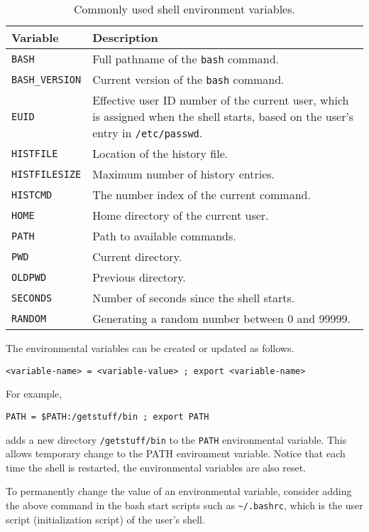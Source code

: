 \begin{table}
	\centering \caption{Commonly used shell environment variables.}\label{ch:sb:tab:shellenvironmentvars}
	\begin{tabularx}{\textwidth}{lX}
		\hline
		Variable & Description \\ \hline
		\verb|BASH| & Full pathname of the \verb|bash| command. \\ 
		\verb|BASH_VERSION| & Current version of the \verb|bash| command. \\ 
		\verb|EUID| & Effective user ID number of the current user, which is assigned when the shell starts, based on the user's entry in \verb|/etc/passwd|. \\ 
		\verb|HISTFILE| & Location of the history file. \\ 
		\verb|HISTFILESIZE| & Maximum number of history entries. \\ 
		\verb|HISTCMD| & The number index of the current command. \\ 
		\verb|HOME| & Home directory of the current user. \\ 
		\verb|PATH| & Path to available commands. \\ 
		\verb|PWD| & Current directory. \\ 
		\verb|OLDPWD| & Previous directory. \\ 
		\verb|SECONDS| & Number of seconds since the shell starts. \\ 
		\verb|RANDOM| & Generating a random number between 0 and 99999. \\
		\hline
	\end{tabularx}
\end{table}

The environmental variables can be created or updated as follows.
\begin{lstlisting}
<variable-name> = <variable-value> ; export <variable-name>
\end{lstlisting}
For example,
\begin{lstlisting}
PATH = $PATH:/getstuff/bin ; export PATH
\end{lstlisting}
adds a new directory \verb|/getstuff/bin| to the \verb|PATH| environmental variable. This allows temporary change to the PATH environment variable. Notice that each time the shell is restarted, the environmental variables are also reset. 

To permanently change the value of an environmental variable, consider adding the above command in the bash start scripts such as \verb|~/.bashrc|, which is the user script (initialization script) of the user's shell.


